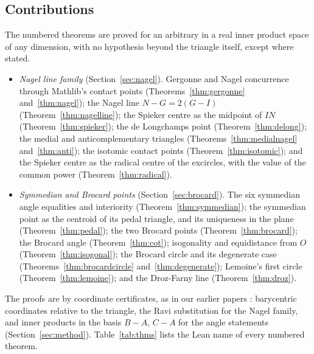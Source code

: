 \documentclass[11pt]{article}
\theoremstyle{definition}
\theoremstyle{remark}
\begin{document}
\subsection{Contributions}
The numbered theorems are proved for an arbitrary  in a real inner product space of any
dimension, with no hypothesis beyond the triangle itself, except where stated.
\begin{itemize}
\item \emph{Nagel line family} (Section~\ref{sec:nagel}). Gergonne and Nagel concurrence through
Mathlib's contact points (Theorems~\ref{thm:gergonne} and~\ref{thm:nagel}); the Nagel line
$N-G=2(G-I)$ (Theorem~\ref{thm:nagelline}); the Spieker centre as the midpoint of $IN$
(Theorem~\ref{thm:spieker}); the de Longchamps point (Theorem~\ref{thm:delong}); the medial and
anticomplementary triangles (Theorems~\ref{thm:medialnagel} and~\ref{thm:anti}); the isotomic
contact points (Theorem~\ref{thm:isotomic}); and the Spieker centre as the radical centre of the
excircles, with the value of the common power (Theorem~\ref{thm:radical}).
\item \emph{Symmedian and Brocard points} (Section~\ref{sec:brocard}). The six symmedian angle
equalities and interiority (Theorem~\ref{thm:symmedian}); the symmedian point as the centroid of its
pedal triangle, and its uniqueness in the plane (Theorem~\ref{thm:pedal}); the two Brocard points
(Theorem~\ref{thm:brocard}); the Brocard angle (Theorem~\ref{thm:cot}); isogonality and
equidistance from $O$ (Theorem~\ref{thm:isogonal}); the Brocard circle and its degenerate case
(Theorems~\ref{thm:brocardcircle} and~\ref{thm:degenerate}); Lemoine's first circle
(Theorem~\ref{thm:lemoine}); and the Droz-Farny line (Theorem~\ref{thm:droz}).
\end{itemize}
The proofs are by coordinate certificates, as in our earlier papers
\cite{paperA,paperB,paperC,paperD,paperE,paperF}: barycentric coordinates relative to the triangle,
the Ravi substitution for the Nagel family, and inner products in the basis $B-A$, $C-A$ for the
angle statements (Section~\ref{sec:method}). Table~\ref{tab:thms} lists the Lean name of every
numbered theorem.
\end{document}
